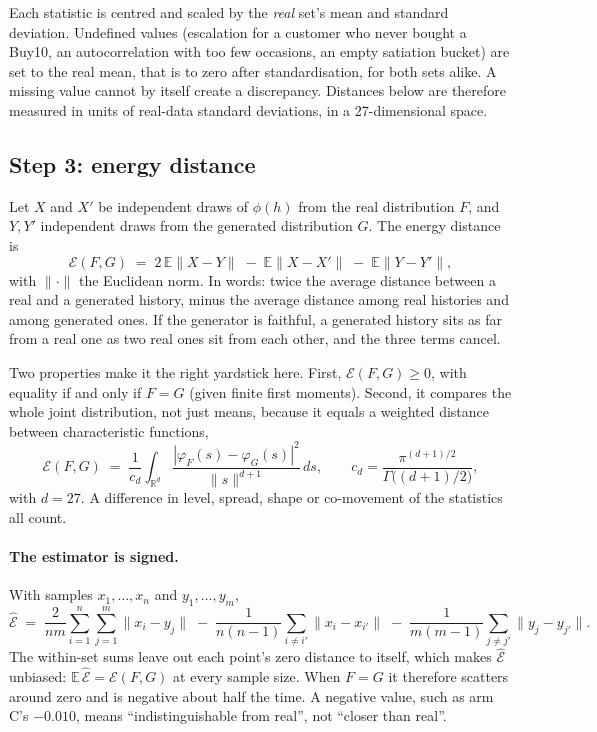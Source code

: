 \documentclass[11pt]{article}
\newcommand{\E}{\mathbb{E}}
\newcommand{\norm}[1]{\lVert #1 \rVert}
\begin{document}
Each statistic is centred and scaled by the \emph{real} set's mean and standard
deviation. Undefined values (escalation for a customer who never bought a
Buy10, an autocorrelation with too few occasions, an empty satiation bucket)
are set to the real mean, that is to zero after standardisation, for both sets
alike. A missing value cannot by itself create a discrepancy. Distances below
are therefore measured in units of real-data standard deviations, in a
27-dimensional space.

\subsection{Step 3: energy distance}

Let $X$ and $X'$ be independent draws of $\phi(h)$ from the real distribution
$F$, and $Y, Y'$ independent draws from the generated distribution $G$. The
energy distance \citep{szekely2013} is
\begin{equation}
\mathcal{E}(F,G) \;=\; 2\,\E\norm{X - Y} \;-\; \E\norm{X - X'} \;-\; \E\norm{Y - Y'},
\label{eq:ed}
\end{equation}
with $\norm{\cdot}$ the Euclidean norm. In words: twice the average distance
between a real and a generated history, minus the average distance among real
histories and among generated ones. If the generator is faithful, a generated
history sits as far from a real one as two real ones sit from each other, and
the three terms cancel.

Two properties make it the right yardstick here. First,
$\mathcal{E}(F,G) \ge 0$, with equality if and only if $F = G$ (given finite
first moments). Second, it compares the whole joint distribution, not just
means, because it equals a weighted distance between characteristic functions,
\begin{equation}
\mathcal{E}(F,G) \;=\; \frac{1}{c_d}\int_{\mathbb{R}^d}
\frac{|\varphi_F(s) - \varphi_G(s)|^2}{\norm{s}^{d+1}}\, ds,
\qquad c_d = \frac{\pi^{(d+1)/2}}{\Gamma\big((d+1)/2\big)},
\end{equation}
with $d = 27$. A difference in level, spread, shape or co-movement of the
statistics all count.

\paragraph{The estimator is signed.} With samples $x_1,\dots,x_n$ and
$y_1,\dots,y_m$,
\begin{equation}
\widehat{\mathcal{E}} \;=\; \frac{2}{nm}\sum_{i=1}^{n}\sum_{j=1}^{m}\norm{x_i - y_j}
\;-\; \frac{1}{n(n-1)}\sum_{i \ne i'}\norm{x_i - x_{i'}}
\;-\; \frac{1}{m(m-1)}\sum_{j \ne j'}\norm{y_j - y_{j'}} .
\label{eq:edhat}
\end{equation}
The within-set sums leave out each point's zero distance to itself, which makes
$\widehat{\mathcal{E}}$ unbiased: $\E\,\widehat{\mathcal{E}} = \mathcal{E}(F,G)$
at every sample size. When $F = G$ it therefore scatters around zero and is
negative about half the time. A negative value, such as arm C's $-0.010$, means
``indistinguishable from real'', not ``closer than real''.
\end{document}
